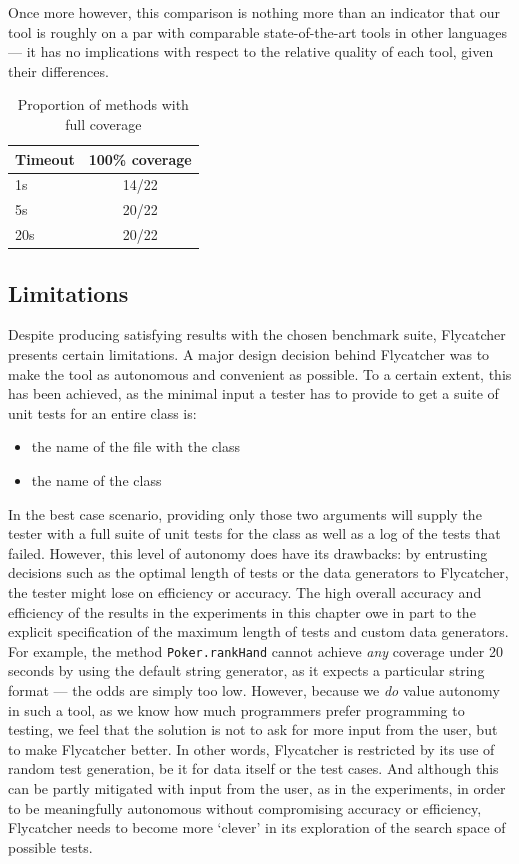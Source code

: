 Once more however, this comparison is nothing more than an indicator that our tool is roughly on a par with comparable state-of-the-art tools in other languages --- it has no implications with respect to the relative quality of each tool, given their differences.

\begin{table}[b]
\centering
\begin{tabular}{lc}
\toprule
\textbf{Timeout} & \textbf{100\% coverage} \\
\toprule
1s & 14/22 \\
5s & 20/22 \\
20s & 20/22 \\
\bottomrule
\end{tabular}
\caption{Proportion of methods with full coverage}
\label{covresults}
\end{table}


\subsection{Limitations}
Despite producing satisfying results with the chosen benchmark suite, \textsf{Flycatcher} presents certain limitations. A major design decision behind \textsf{Flycatcher} was to make the tool as autonomous and convenient as possible. To a certain extent, this has been achieved, as the minimal input a tester has to provide to get a suite of unit tests for an entire class is:

\begin{itemize}
   \item the name of the file with the class
   \item the name of the class
\end{itemize}

In the best case scenario, providing only those two arguments will supply the tester with a full suite of unit tests for the class as well as a log of the tests that failed. However, this level of autonomy does have its drawbacks: by entrusting decisions such as the optimal length of tests or the data generators to \textsf{Flycatcher}, the tester might lose on efficiency or accuracy. The high overall accuracy and efficiency of the results in the experiments in this chapter owe in part to the explicit specification of the maximum length of tests and custom data generators. For example, the method \texttt{Poker.rankHand} cannot achieve \emph{any} coverage under 20 seconds by using the default string generator, as it expects a particular string format --- the odds are simply too low. However, because we \emph{do} value autonomy in such a tool, as we know how much programmers prefer programming to testing, we feel that the solution is not to ask for more input from the user, but to make \textsf{Flycatcher} better. In other words, \textsf{Flycatcher} is restricted by its use of random test generation, be it for data itself or the test cases. And although this can be partly mitigated with input from the user, as in the experiments, in order to be meaningfully autonomous without compromising accuracy or efficiency, \textsf{Flycatcher} needs to become more `clever' in its exploration of the search space of possible tests.\\

